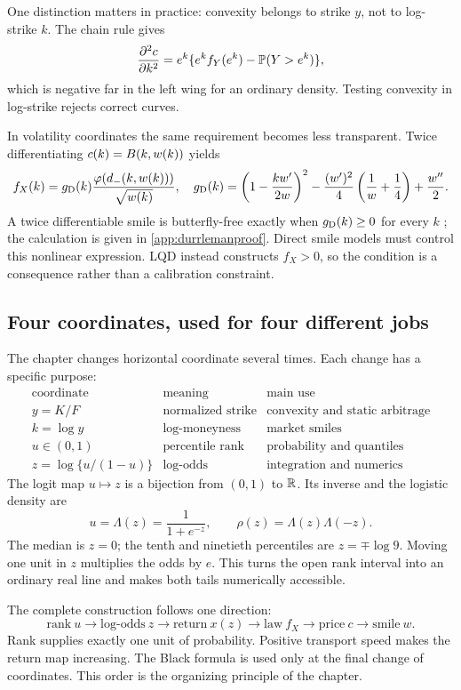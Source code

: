 One distinction matters in practice: convexity belongs to strike $y$, not to
log-strike $k$.  The chain rule gives
\[
\frac{\partial^2c}{\partial k^2}
=e^k\{e^kf_Y(e^k)-\mathbb{P}(Y>e^k)\},
\]
which is negative far in the left wing for an ordinary density.  Testing
convexity in log-strike rejects correct curves.

In volatility coordinates the same requirement becomes less transparent.
Twice differentiating $c(k)=B(k,w(k))$ yields
\begin{equation}
f_X(k)=g_{\rm D}(k)\frac{\varphi(d_-(k,w(k)))}{\sqrt{w(k)}},
\quad
g_{\rm D}(k)=
\left(1-\frac{k w'}{2w}\right)^2
-\frac{(w')^2}{4}\left(\frac1w+\frac14\right)+\frac{w''}{2}.
\label{eq:durrleman}
\end{equation}
A twice differentiable smile is butterfly-free exactly when
$g_{\rm D}(k)\ge0$ for every $k$ \citep{GatheralJacquier2014}; the calculation
is given in \cref{app:durrlemanproof}.  Direct smile models must control this
nonlinear expression.  LQD instead constructs $f_X>0$, so the condition is a
consequence rather than a calibration constraint.

\subsection{Four coordinates, used for four different jobs}

The chapter changes horizontal coordinate several times.  Each change has a
specific purpose:
\[
\begin{array}{c|c|c}
\text{coordinate}&\text{meaning}&\text{main use}\\ \hline
y=K/F&\text{normalized strike}&\text{convexity and static arbitrage}\\
k=\log y&\text{log-moneyness}&\text{market smiles}\\
u\in(0,1)&\text{percentile rank}&\text{probability and quantiles}\\
z=\log\{u/(1-u)\}&\text{log-odds}&\text{integration and numerics}
\end{array}
\]
The logit map $u\mapsto z$ is a bijection from $(0,1)$ to $\mathbb{R}$.  Its inverse
and the logistic density are
\begin{equation}
u=\Lambda(z)=\frac1{1+e^{-z}},\qquad
\rho(z)=\Lambda(z)\Lambda(-z).
\label{eq:logodds}
\end{equation}
The median is $z=0$; the tenth and ninetieth percentiles are
$z=\mp\log9$.  Moving one unit in $z$ multiplies the odds by $e$.  This turns
the open rank interval into an ordinary real line and makes both tails
numerically accessible.

The complete construction follows one direction:
\[
\text{rank}\ u
\longrightarrow \text{log-odds}\ z
\longrightarrow \text{return}\ x(z)
\longrightarrow \text{law}\ f_X
\longrightarrow \text{price}\ c
\longrightarrow \text{smile}\ w.
\]
Rank supplies exactly one unit of probability.  Positive transport speed
makes the return map increasing.  The Black formula is used only at the final
change of coordinates.  This order is the organizing principle of the
chapter.
